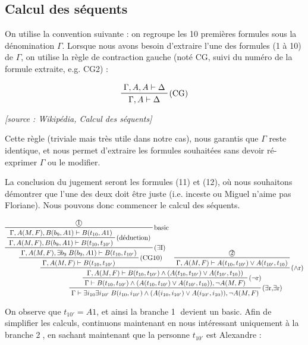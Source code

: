 \documentclass[10pt]{extarticle}
\begin{document}
\newpage
\begin{landscape}
\subsection*{Calcul des séquents}
On utilise la convention suivante : on regroupe les 10 premières formules sous la dénomination $\Gamma$. Lorsque nous avons besoin d'extraire l'une des formules (1 à 10) de $\Gamma$, on utilise la règle de contraction gauche (noté CG, suivi du numéro de la formule extraite, e.g. CG2) :

\begin{displaymath}
\prftree[r]{(CG)}{\Gamma , A , A \vdash \Delta}{\Gamma, A \vdash \Delta}
\end{displaymath}

\begin{center}
\emph{[source : Wikipédia, Calcul des séquents]}
\end{center}

Cette règle (triviale mais très utile dans notre cas), nous garantis que $\Gamma$ reste identique, et nous permet d'extraire les formules souhaitées sans devoir ré-exprimer $\Gamma$ ou le modifier.

La conclusion du jugement seront les formules (11) et (12), où nous souhaitons démontrer que l'une des deux doit être juste (i.e. inceste ou Miguel n'aime pas Floriane). Nous pouvons donc commencer le calcul des séquents.

\begin{displaymath}
\prftree[r]
{($\exists$r,$\exists$r)}
{\prftree[r]{($\neg$r)}
{\prftree[r]{($\land$r)}
{\prftree[r]{(CG10)}
{\prftree[r]{($\exists$I)}
{\prftree[r]{basic}
{\text{\textcircled{1}}}
{\prftree[r]{(déduction)}
{\Gamma , A(M,F) , B(b_9,A1) \vdash B(t_{10},A1)}
{\Gamma , A(M,F) , B(b_9,A1) \vdash B(t_{10},t_{10'})}}}
{\Gamma , A(M,F) , \exists b_9 \; B(b_9,A1) \vdash B(t_{10},t_{10'})}}
{\Gamma , A(M,F) \vdash B(t_{10},t_{10'})}}
{\prftree[r]{}
{\text{\textcircled{2}}}
{\Gamma , A(M,F) \vdash A(t_{10},t_{10'}) \lor A(t_{10'},t_{10})}}
{\Gamma , A(M,F) \vdash B(t_{10},t_{10'}) \land (A(t_{10},t_{10'}) \lor A(t_{10'},t_{10}))}}
{\Gamma \vdash B(t_{10},t_{10'}) \land (A(t_{10},t_{10'}) \lor A(t_{10'},t_{10})), \neg A(M,F)}}
{\Gamma \vdash \exists i_{10} \exists i_{10'} \; B(i_{10},i_{10'}) \land (A(i_{10},i_{10'}) \lor A(i_{10'},i_{10})), \neg A(M,F)}
\end{displaymath}

On observe que $t_{10'} = A1$, et ainsi la branche \textcircled{1} devient un basic. Afin de simplifier les calculs, continuons maintenant en nous intéressant uniquement à la branche \textcircled{2}, en sachant maintenant que la personne $t_{10'}$ est Alexandre :


\end{landscape}
\end{document}
